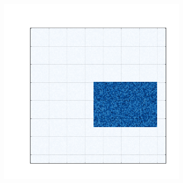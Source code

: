 \documentclass[
    12pt,                %
    oneside,            %
    a4paper,            %
    english,            %
    brazil                %
    ]{abntex2ppgsi}
\begin{document}
\begin{figure} [htpb]  
\centering
 \caption{
        Dados sintéticos gerados a partir das diferentes estruturas de cogrupos.
        (a) Um único cogrupo.
        (b) Cogrupos com linhas e colunas sem intersecção.
        (c) Cogrupos com estrutura em xadrez.  %
        (d) Cogrupos sem intersecção nas linhas e com intersecção nas colunas.
        (e) Cogrupos com intersecção nas linhas e sem intersecção nas colunas.
    }
    \begin{subfigure}[b]{0.18\textwidth}
        \includegraphics[width=\textwidth]{img/a-bic-structure.png}
        \caption{}
        \label{fig:bic-syntetic-structure:a}
    \end{subfigure}
    ~ %
    \begin{subfigure}[b]{0.18\textwidth}

\end{subfigure}
\end{figure}
\end{document}
